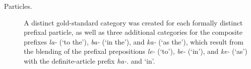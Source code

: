 \begin{description}


\item[Particles.]
A distinct gold-standard category was created for each formally distinct prefixal particle, as well as three additional categories for the composite
prefixes \textit{la-} (`to the'), \textit{ba-} (`in the'), and \textit{ka-} (`as the'), 
which result from the blending of the prefixal prepositions \textit{le-} (`to'), 
\textit{be-} (`in'), and \textit{ke-} (`as') with the definite-article prefix \textit{ha-}.
and  `in'. 
\end{description}

